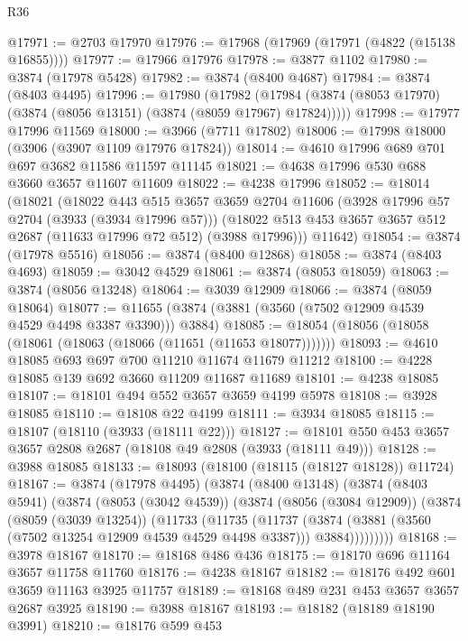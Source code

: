 \begin{lexlean}{R36}
\begin{coremodule}
@17971 := @2703 @17970
@17976 := @17968 (@17969 (@17971 (@4822 (@15138 @16855))))
@17977 := @17966 @17976
@17978 := @3877 @1102
@17980 := @3874 (@17978 @5428)
@17982 := @3874 (@8400 @4687)
@17984 := @3874 (@8403 @4495)
@17996 := @17980
    (@17982 (@17984 (@3874 (@8053 @17970) (@3874 (@8056 @13151) (@3874 (@8059 @17967) @17824)))))
@17998 := @17977 @17996 @11569
@18000 := @3966 (@7711 @17802)
@18006 := @17998 @18000 (@3906 (@3907 @1109 @17976 @17824))
@18014 := @4610 @17996 @689 @701 @697 @3682 @11586 @11597 @11145
@18021 := @4638 @17996 @530 @688 @3660 @3657 @11607 @11609
@18022 := @4238 @17996
@18052 := @18014
    (@18021
      (@18022
        @443
        @515
        @3657
        @3659
        @2704
        @11606
        (@3928 @17996 @57 @2704 (@3933 (@3934 @17996 @57)))
        (@18022 @513 @453 @3657 @3657 @512 @2687 (@11633 @17996 @72 @512) (@3988 @17996)))
      @11642)
@18054 := @3874 (@17978 @5516)
@18056 := @3874 (@8400 @12868)
@18058 := @3874 (@8403 @4693)
@18059 := @3042 @4529
@18061 := @3874 (@8053 @18059)
@18063 := @3874 (@8056 @13248)
@18064 := @3039 @12909
@18066 := @3874 (@8059 @18064)
@18077 := @11655 (@3874 (@3881 (@3560 (@7502 @12909 @4539 @4529 @4498 @3387 @3390))) @3884)
@18085 := @18054 (@18056 (@18058 (@18061 (@18063 (@18066 (@11651 (@11653 @18077)))))))
@18093 := @4610 @18085 @693 @697 @700 @11210 @11674 @11679 @11212
@18100 := @4228 @18085 @139 @692 @3660 @11209 @11687 @11689
@18101 := @4238 @18085
@18107 := @18101 @494 @552 @3657 @3659 @4199 @5978
@18108 := @3928 @18085
@18110 := @18108 @22 @4199
@18111 := @3934 @18085
@18115 := @18107 (@18110 (@3933 (@18111 @22)))
@18127 := @18101 @550 @453 @3657 @3657 @2808 @2687 (@18108 @49 @2808 (@3933 (@18111 @49)))
@18128 := @3988 @18085
@18133 := @18093 (@18100 (@18115 (@18127 @18128)) @11724)
@18167 := @3874
    (@17978 @4495)
    (@3874
      (@8400 @13148)
      (@3874
        (@8403 @5941)
        (@3874
          (@8053 (@3042 @4539))
          (@3874
            (@8056 (@3084 @12909))
            (@3874
              (@8059 (@3039 @13254))
              (@11733
                (@11735
                  (@11737
                    (@3874
                      (@3881 (@3560 (@7502 @13254 @12909 @4539 @4529 @4498 @3387)))
                      @3884)))))))))
@18168 := @3978 @18167
@18170 := @18168 @486 @436
@18175 := @18170 @696 @11164 @3657 @11758 @11760
@18176 := @4238 @18167
@18182 := @18176 @492 @601 @3659 @11163 @3925 @11757
@18189 := @18168 @489 @231 @453 @3657 @3657 @2687 @3925
@18190 := @3988 @18167
@18193 := @18182 (@18189 @18190 @3991)
@18210 := @18176
    @599
    @453

\end{coremodule}
\end{lexlean}
